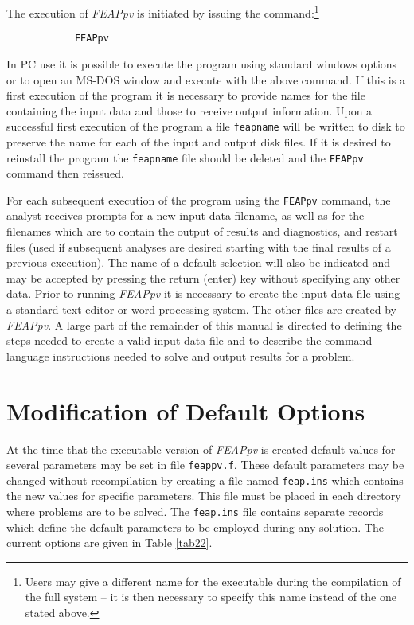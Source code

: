 The execution of {\sl FEAPpv} is initiated by issuing the command:\footnote{Users
may give a different name for the executable during the compilation of the full
system -- it is then necessary to specify this name instead of the one stated above.}
\vskip 0.1in \par\noindent
\begin{verbatim}
            FEAPpv
\end{verbatim}
In PC use it is possible to execute the program using standard windows options
or to open an MS-DOS window and execute with the above command.
If this is a first execution of the program it is necessary to
provide names for the file containing
the input data and those to receive output information.  Upon a successful first
execution of the program a file {\tt feapname} will be written to disk to
preserve the name for each of the input and output disk files.
If it is desired to reinstall the program the {\tt feapname}
file should be deleted and the {\tt FEAPpv} command then reissued.

For each subsequent execution of the program using the {\tt FEAPpv} command,
the analyst receives prompts for a new input data filename,
as well as for the filenames which are to contain the
output of results and diagnostics, and
restart files (used if subsequent analyses are desired starting 
with the final results of a previous execution).
The name of a default selection will also be indicated and may be accepted
by pressing the return (enter) key without specifying any other data.
Prior to running {\sl FEAPpv} it is necessary to create the input data file
using a standard text editor or word processing system. The other
files are created by {\sl FEAPpv}.  A large part of the remainder of
this manual is directed to defining
the steps needed to create a valid input data file and to describe the
command language instructions needed to solve and output results for
a problem.

\section{Modification of Default Options}

At the time that the executable version of {\sl FEAPpv} is created
default values for several parameters may be set in file {\tt feappv.f}.
These default parameters may be changed without recompilation
by creating a file named {\tt feap.ins} which contains the new values for
specific parameters.  This file must be placed in each directory where
problems are to be solved.  The {\tt feap.ins} file contains separate records
which define the default parameters to be employed during any solution.  The
current options are given in Table \ref{tab22}.

